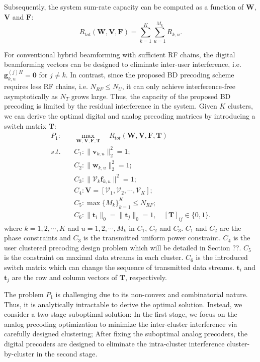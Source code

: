 \documentclass[conference]{IEEEtran}
\begin{document}
{Subsequently, the system sum-rate capacity can be computed as a function of $\bm{W}$, ${\bm V}$ and ${\bm F}$:
\begin{equation}
R_{tot}(\bm{W}, \bm{V}, \bm{F})=\sum_{k=1}^{K}\sum_{u=1}^{M_k}R_{k,u}.
\end{equation}

For conventional hybrid beamforming with sufficient RF chains, the digital beamforming vectors can be designed to eliminate inter-user interference, i.e. ${\bm{g}}^{(j)H}_{k,u}={\bm 0}$ for $j\neq k$. In contrast, since the proposed BD precoding scheme requires less RF chains, i.e. $N_{RF}\leq N_U$, it can only achieve interference-free asymptotically as $N_T$ grows large. Thus, the capacity of the proposed BD precoding is limited by the residual interference in the system. Given $K$ clusters, we can derive the optimal digital and analog precoding matrices by introducing a switch matrix ${\bm T}$:
\begin{align}\label{eq:maxsumrate}
P_1: \quad&\max_{\bm W, \bm{V},\bm F, \bm T}\quad R_{tot}(\bm{W}, \bm{V}, \bm{F}, {\bm T})\\ \nonumber
s.t. \quad&C_1: \|\bm{v}_{k,u}\|^2_2=1; \\
&C_2: \|\bm{w}_{k,u}\|^2_2=1;\nonumber\\
&C_3: \|\bm{\mathcal{V}}_k \bm{f}_{k,u}\|^2=1;\nonumber\\
&C_4: \bm{V} = [\bm{\mathcal{V}}_1, \bm{\mathcal{V}}_2, \cdots, \bm{\mathcal{V}}_K];\nonumber\\
&C_5: \max \{M_k\}_{k=1}^K \leq N_{RF};\nonumber\\
&C_6: \|\bm{t}_{i}\|_0=\|\bm{t}_{j}\|_0=1, \quad [\bm{T}]_{ij}\in\{0,1\}.\nonumber
\end{align}
where $k=1,2,\cdots,K$ and $u = 1, 2, \cdots, M_k$ in $C_1$, $C_2$ and $C_3$. $C_1$ and $C_2$ are the phase constraints and $C_3$ is the transmitted uniform power constraint. $C_4$ is the user clustered precoding design problem which will be detailed in Section ??. $C_5$ is the constraint on maximal data streams in each cluster. $C_6$ is the introduced switch matrix which can change the sequence of transmitted data streams. $\bm{t}_{i}$ and $\bm{t}_{j}$ are the row and column vectors of $\bm{T}$, respectively.

The problem $P_1$ is challenging due to its non-convex and combinatorial nature. Thus, it is analytically intractable to derive the optimal solution. Instead, we consider a two-stage suboptimal solution: In the first stage, we focus on the analog precoding optimization to minimize the inter-cluster interference via carefully designed clustering; After fixing the suboptimal analog precoders, the digital precoders are designed to eliminate the intra-cluster interference cluster-by-cluster in the second stage.

}
\end{document}
